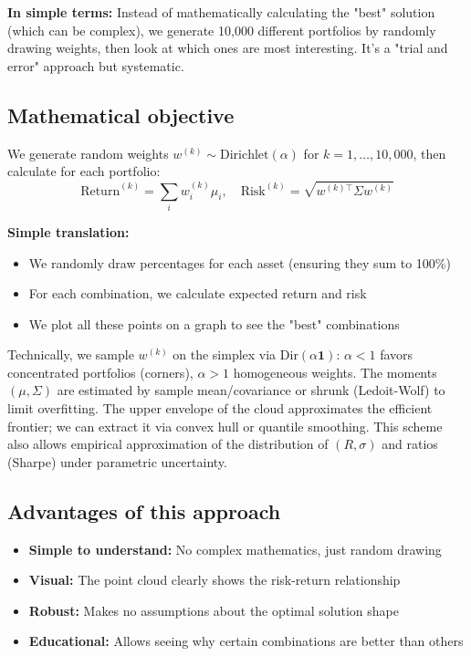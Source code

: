 \documentclass[11pt,a4paper]{article}
\begin{document}
\textbf{In simple terms:} Instead of mathematically calculating the "best" solution (which can be complex), we generate 10,000 different portfolios by randomly drawing weights, then look at which ones are most interesting. It's a "trial and error" approach but systematic.

\subsection{Mathematical objective}
We generate random weights \(w^{(k)} \sim \text{Dirichlet}(\alpha)\) for \(k = 1, \ldots, 10,000\), then calculate for each portfolio:
\[\text{Return}^{(k)} = \sum_i w_i^{(k)} \mu_i, \quad \text{Risk}^{(k)} = \sqrt{w^{(k)\top} \Sigma w^{(k)}}\]

\textbf{Simple translation:} 
\begin{itemize}
\item We randomly draw percentages for each asset (ensuring they sum to 100\%)
\item For each combination, we calculate expected return and risk
\item We plot all these points on a graph to see the "best" combinations
\end{itemize}
\noindent Technically, we sample \(w^{(k)}\) on the simplex via \(\text{Dir}(\alpha\mathbf{1})\): \(\alpha<1\) favors concentrated portfolios (corners), \(\alpha>1\) homogeneous weights. The moments \((\mu,\Sigma)\) are estimated by sample mean/covariance or shrunk (Ledoit-Wolf) to limit overfitting. The upper envelope of the cloud approximates the efficient frontier; we can extract it via convex hull or quantile smoothing. This scheme also allows empirical approximation of the distribution of \((R,\sigma)\) and ratios (Sharpe) under parametric uncertainty.

\subsection{Advantages of this approach}
\begin{itemize}
\item \textbf{Simple to understand:} No complex mathematics, just random drawing
\item \textbf{Visual:} The point cloud clearly shows the risk-return relationship
\item \textbf{Robust:} Makes no assumptions about the optimal solution shape
\item \textbf{Educational:} Allows seeing why certain combinations are better than others
\end{itemize}
\end{document}
